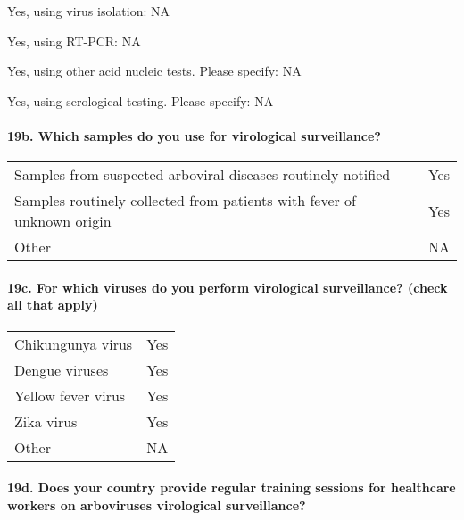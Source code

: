 \documentclass[
]{article}
\begin{document}
Yes, using virus isolation: NA

Yes, using RT-PCR: NA

Yes, using other acid nucleic tests. Please specify: NA

Yes, using serological testing. Please specify: NA

\hypertarget{b.-which-samples-do-you-use-for-virological-surveillance}{%
\paragraph{19b. Which samples do you use for virological
surveillance?}\label{b.-which-samples-do-you-use-for-virological-surveillance}}

\begin{longtable}[]{@{}
  >{\raggedright\arraybackslash}p{}
  >{\raggedright\arraybackslash}p{}@{}}
\toprule
\endhead
Samples from suspected arboviral diseases routinely notified & Yes \\
Samples routinely collected from patients with fever of unknown origin &
Yes \\
Other & NA \\
\bottomrule
\end{longtable}

\hypertarget{c.-for-which-viruses-do-you-perform-virological-surveillance-check-all-that-apply}{%
\paragraph{19c. For which viruses do you perform virological
surveillance? (check all that
apply)}\label{c.-for-which-viruses-do-you-perform-virological-surveillance-check-all-that-apply}}

\begin{longtable}[]{@{}ll@{}}
\toprule
\endhead
Chikungunya virus & Yes \\
Dengue viruses & Yes \\
Yellow fever virus & Yes \\
Zika virus & Yes \\
Other & NA \\
\bottomrule
\end{longtable}

\hypertarget{d.-does-your-country-provide-regular-training-sessions-for-healthcare-workers-on-arboviruses-virological-surveillance}{%
\paragraph{19d. Does your country provide regular training sessions for
healthcare workers on arboviruses virological
surveillance?}\label{d.-does-your-country-provide-regular-training-sessions-for-healthcare-workers-on-arboviruses-virological-surveillance}}
\end{document}
